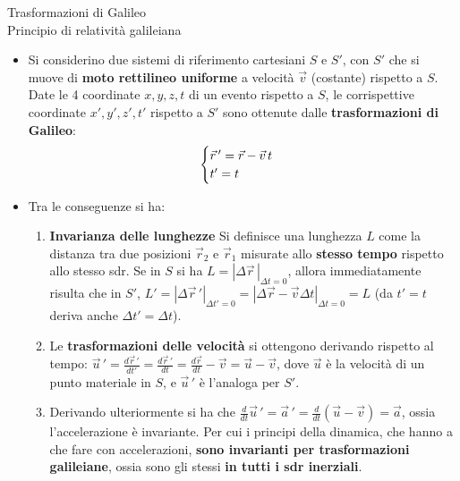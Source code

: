 \documentclass[a4_2,grid,frame]{flashcards}
\newenvironment{cartaflash}
    {\vspace{-15pt}
    \begin{itemize}
    }
    {
    \end{itemize}
    }
\begin{document}

\begin{flashcard}[Trasformazioni]{Trasformazioni di Galileo\\Principio di relatività galileiana}
\begin{cartaflash}
\item Si considerino due sistemi di riferimento cartesiani $S$ e $S'$, con $S'$ che si muove di \textbf{moto rettilineo uniforme} a velocità $\vec{v}$ (costante) rispetto a $S$. Date le 4 coordinate $x,y,z,t$ di un evento rispetto a $S$, le corrispettive coordinate $x',y',z',t'$ rispetto a $S'$ sono ottenute dalle \textbf{trasformazioni di Galileo}:
\vspace{-17pt}
\[
\begin{cases}
\vec{r}\,' = \vec{r}-\vec{v}\,t\\
t' = t
\end{cases}
\vspace{-17pt}
\]
\item Tra le conseguenze si ha:
\vspace{-7pt}
\begin{enumerate}
    \item \textbf{Invarianza delle lunghezze} Si definisce una lunghezza $L$ come la distanza tra due posizioni $\vec{r}_2$ e $\vec{r}_1$ misurate allo \textbf{stesso tempo} rispetto allo stesso sdr. Se in $S$ si ha $L = |\Delta \vec{r}\,|_{\Delta t = 0}$, allora immediatamente risulta che in $S'$, $L' = |\Delta \vec{r}\,'|_{\Delta t' = 0} = |\Delta \vec{r}-\vec{v}\Delta t|_{\Delta t=0} = L$ (da $t' = t$ deriva anche $\Delta t' = \Delta t$).
    \item Le \textbf{trasformazioni delle velocità} si ottengono derivando rispetto al tempo: $\vec{u}\,' = \frac{d\vec{r}\,'}{dt'} = \frac{d\vec{r}\,'}{dt} = \frac{d\vec{r}}{dt} - \vec{v} = \vec{u}-\vec{v}$, dove $\vec{u}$ è la velocità di un punto materiale in $S$, e $\vec{u}\,'$ è l'analoga per $S'$.
    \item Derivando ulteriormente si ha che $\frac{d}{dt}\vec{u}\,' = \vec{a}\,' = \frac{d}{dt}(\vec{u}-\vec{v}) = \vec{a}$, ossia l'accelerazione è invariante. Per cui i principi della dinamica, che hanno a che fare con accelerazioni, \textbf{sono invarianti per trasformazioni galileiane}, ossia sono gli stessi \textbf{in tutti i sdr inerziali}. 
\end{enumerate}
\end{cartaflash}
\end{flashcard}
\end{document}
